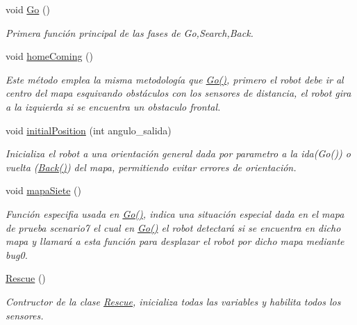 \begin{DoxyCompactItemize}
void \hyperlink{classRescue_acfe79ba42004fd73e17e240c0201462a_acfe79ba42004fd73e17e240c0201462a}{Go} ()
\begin{DoxyCompactList}\small\item\em Primera función principal de las fases de Go,Search,Back. \end{DoxyCompactList}\item 
void \hyperlink{classRescue_a85cbbec8d486f16e260d3f74c3221831_a85cbbec8d486f16e260d3f74c3221831}{home\+Coming} ()
\begin{DoxyCompactList}\small\item\em Este método emplea la misma metodología que \hyperlink{classRescue_acfe79ba42004fd73e17e240c0201462a_acfe79ba42004fd73e17e240c0201462a}{Go()}, primero el robot debe ir al centro del mapa esquivando obstáculos con los sensores de distancia, el robot gira a la izquierda si se encuentra un obstaculo frontal. \end{DoxyCompactList}\item 
void \hyperlink{classRescue_a3c978120304fcdbe702f3e306bef6c02_a3c978120304fcdbe702f3e306bef6c02}{initial\+Position} (int angulo\+\_\+salida)
\begin{DoxyCompactList}\small\item\em Inicializa el robot a una orientación general dada por parametro a la ida(\+Go()) o vuelta (\hyperlink{classRescue_a5acc91c16b60baf09a87f440a22f030f_a5acc91c16b60baf09a87f440a22f030f}{Back()}) del mapa, permitiendo evitar errores de orientación. \end{DoxyCompactList}\item 
void \hyperlink{classRescue_a7db0c26d41013e7405311d2725efce86_a7db0c26d41013e7405311d2725efce86}{mapa\+Siete} ()
\begin{DoxyCompactList}\small\item\em Función especifia usada en \hyperlink{classRescue_acfe79ba42004fd73e17e240c0201462a_acfe79ba42004fd73e17e240c0201462a}{Go()}, indica una situación especial dada en el mapa de prueba scenario7 el cual en \hyperlink{classRescue_acfe79ba42004fd73e17e240c0201462a_acfe79ba42004fd73e17e240c0201462a}{Go()} el robot detectará si se encuentra en dicho mapa y llamará a esta función para desplazar el robot por dicho mapa mediante bug0. \end{DoxyCompactList}\item 
\hyperlink{classRescue_a307e122659d2fbe9e17f51108951752f_a307e122659d2fbe9e17f51108951752f}{Rescue} ()
\begin{DoxyCompactList}\small\item\em Contructor de la clase \hyperlink{classRescue}{Rescue}, inicializa todas las variables y habilita todos los sensores. \end{DoxyCompactList}\item 

\end{DoxyCompactItemize}
